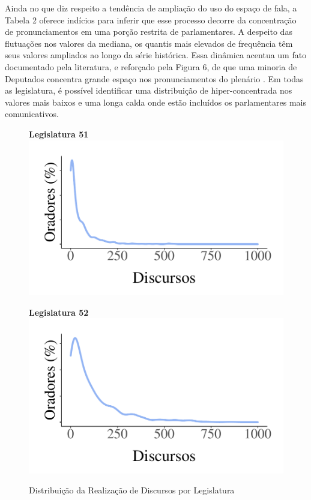 \documentclass[
12pt,				%
openright,			%
twoside,			%
a4paper,			%
english,			%
french,				%
spanish,			%
brazil				%
]{abntex2}
\begin{document}
Ainda no que diz respeito a tendência de ampliação do uso do espaço de fala, a Tabela 2 oferece indícios para inferir que esse processo decorre da concentração de pronunciamentos em uma porção restrita de parlamentares. A despeito das flutuações nos valores da mediana, os quantis mais elevados de frequência têm seus valores ampliados ao longo da série histórica. Essa dinâmica acentua um fato documentado pela literatura, e reforçado pela Figura 6, de que uma minoria de Deputados concentra grande espaço nos pronunciamentos do plenário \cite{moreira2016palavra}. Em todas as legislatura, é possível identificar uma distribuição de hiper-concentrada nos valores mais baixos e uma longa calda onde estão incluídos os parlamentares mais comunicativos.    

\begin{figure}[!htb]
	\caption{Distribuição da Realização de Discursos por Legislatura}
	\centering
	
	\hspace{.05\linewidth}
	\begin{minipage}[b]{0.3\textwidth}
	\textbf{Legislatura 51}
	\label{fig:dens_legis_51}
	\centering
	\includegraphics[width=1\linewidth]{figures/dens_oradores_51}
	
	\end{minipage}
	\hspace{.05\linewidth}
	\begin{minipage}[b]{0.3\textwidth}
		\textbf{Legislatura 52}
		\label{fig:dens_legis_52}
		\centering
		\includegraphics[width=1\linewidth]{figures/dens_oradores_52}
		

\end{minipage}
\end{figure}
\end{document}
